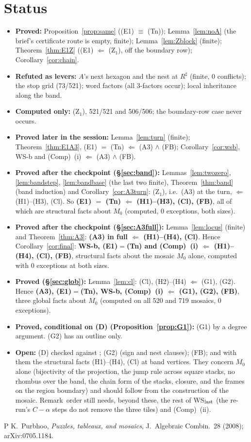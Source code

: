 \documentclass[11pt]{article}
\theoremstyle{definition}\newtheorem{definition}[theorem]{Definition}\newtheorem{remark}[theorem]{Remark}
\begin{document}
\section{Status}
\begin{itemize}
\item \textbf{Proved:} Proposition~\ref{prop:same} ((E1) $\equiv$ (Tn)); Lemma~\ref{lem:noA} (the brief's certificate route is empty, finite); Lemma~\ref{lem:Zblock} (finite); Theorem~\ref{thm:E1Z} ((E1) $\Leftarrow$ (Z$_1$), off the boundary row); Corollary~\ref{cor:chain}.
\item \textbf{Refuted as levers:} $A$'s next hexagon and the nest at $R^\sharp$ (finite, 0 conflicts); the stop grid (73/521); word factors (all 3-factors occur); local inheritance along the band.
\item \textbf{Computed only:} (Z$_1$), 521/521 and 506/506; the boundary-row case never occurs.
\item \textbf{Proved later in the session:} Lemma~\ref{lem:turn} (finite); Theorem~\ref{thm:E1A3}, (E1) $=$ (Tn) $\Leftarrow$ (A3) $\wedge$ (FB); Corollary~\ref{cor:wsb}, WS-b and (Comp)~(i) $\Leftarrow$ (A3) $\wedge$ (FB).
\item \textbf{Proved after the checkpoint (\S\ref{sec:band}):} Lemmas~\ref{lem:twozero}, \ref{lem:bandstep}, \ref{lem:bandbase} (the last two finite), Theorem~\ref{thm:band} (band induction) and Corollary~\ref{cor:A3turn}: (Z$_1$), i.e.\ (A3) at the turn, $\Leftarrow$ (H1)--(H3), (Cl). So \textbf{(E1) $=$ (Tn) $\Leftarrow$ (H1)--(H3), (Cl), (FB)}, all of which are structural facts about $M_0$ (computed, 0 exceptions, both sizes).
\item \textbf{Proved after the checkpoint (\S\ref{sec:A3full}):} Lemma~\ref{lem:locus} (finite) and Theorem~\ref{thm:A3}: \textbf{(A3) in full $\Leftarrow$ (H1)--(H4), (Cl)}. Hence Corollary~\ref{cor:final}: \textbf{WS-b, (E1)$=$(Tn) and (Comp)~(i) $\Leftarrow$ (H1)--(H4), (Cl), (FB)}, structural facts about the mosaic $M_0$ alone, computed with 0 exceptions at both sizes.
\item \textbf{Proved (\S\ref{sec:glob}):} Lemma~\ref{lem:cl}: (Cl), (H2)--(H4) $\Leftarrow$ (G1), (G2). Hence \textbf{(A3), (E1)$=$(Tn), WS-b, (Comp)~(i) $\Leftarrow$ (G1), (G2), (FB)}, three global facts about $M_0$ (computed on all 520 and 719 mosaics, 0 exceptions).
\item \textbf{Proved, conditional on (D) (Proposition~\ref{prop:G1}):} (G1) by a degree argument. (G2) has an outline only.
\item \textbf{Open:} (D) checked against \cite{P}; (G2) (sign and nest clauses); (FB); and with them the structural facts (H1)--(H4), (Cl) at band vertices. They concern $M_0$ alone (bijectivity of the projection, the jump rule across square stacks, no rhombus over the band, the chain form of the stacks, closure, and the frames on the region boundary) and should follow from the construction of the mosaic. Remark~order still needs, beyond these, the rest of WS$_{\rm last}$ (the re-run's $C-\alpha$ steps do not remove the three tiles) and (Comp)~(ii).
\end{itemize}
\begin{thebibliography}{P}
 K.~Purbhoo, \emph{Puzzles, tableaux, and mosaics}, J.~Algebraic Combin.\ 28 (2008); arXiv:0705.1184.
\end{thebibliography}
\end{document}
